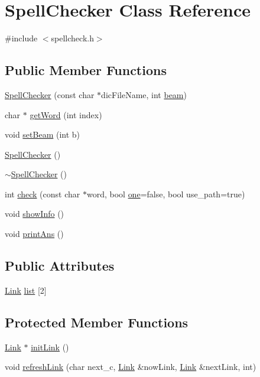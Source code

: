 \hypertarget{class_spell_checker}{\section{Spell\+Checker Class Reference}
\label{class_spell_checker}
}


{\ttfamily \#include $<$spellcheck.\+h$>$}

\subsection*{Public Member Functions}
\begin{DoxyCompactItemize}
\item 
\hyperlink{class_spell_checker_a900b34f6161abb0151678f34be07d8f9}{Spell\+Checker} (const char $\ast$dic\+File\+Name, int \hyperlink{class_spell_checker_acaf7176c06b86947773cbb83d7574783}{beam})
\item 
char $\ast$ \hyperlink{class_spell_checker_af5801d7b974e71ba7a382a5c5e056d41}{get\+Word} (int index)
\item 
void \hyperlink{class_spell_checker_aa7d8af30c6f029106004998b7d4da56d}{set\+Beam} (int b)
\item 
\hyperlink{class_spell_checker_ac65b662a48473a0b4c0b5b71e86c4b59}{Spell\+Checker} ()
\item 
\hyperlink{class_spell_checker_a26007dcd1c90cdaa790528e68443e9a6}{$\sim$\+Spell\+Checker} ()
\item 
int \hyperlink{class_spell_checker_a9b53c92d8e2ed48994d15c7ebdfa7176}{check} (const char $\ast$word, bool \hyperlink{class_spell_checker_a95d95e0ded8b4e1493a406746e509866}{one}=false, bool use\+\_\+path=true)
\item 
void \hyperlink{class_spell_checker_ad3f1f2d070dd63b772782d3d50605ac9}{show\+Info} ()
\item 
void \hyperlink{class_spell_checker_a187d460357c945d899977e0cd1269964}{print\+Ans} ()
\end{DoxyCompactItemize}
\subsection*{Public Attributes}
\begin{DoxyCompactItemize}
\item 
\hyperlink{class_link}{Link} \hyperlink{class_spell_checker_a935dea2584e5fdec80a2fe07e5cb08c3}{list} \mbox{[}2\mbox{]}
\end{DoxyCompactItemize}
\subsection*{Protected Member Functions}
\begin{DoxyCompactItemize}
\item 
\hyperlink{class_link}{Link} $\ast$ \hyperlink{class_spell_checker_aca55ad92aea6ede35932e868f6bbe66d}{init\+Link} ()
\item 
void \hyperlink{class_spell_checker_ae26f47f3595a3e4859172a4a1af87442}{refresh\+Link} (char next\+\_\+c, \hyperlink{class_link}{Link} \&now\+Link, \hyperlink{class_link}{Link} \&next\+Link, int)
\end{DoxyCompactItemize}
